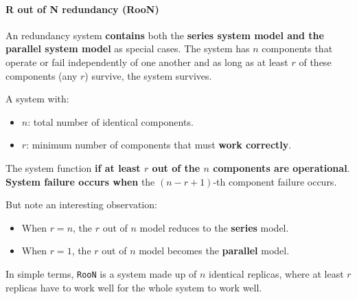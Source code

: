 \newpage

\paragraph{R out of N redundancy (RooN)}

An  redundancy system \textbf{contains} both the \textbf{series system model and the parallel system model} as special cases. The system has $n$ components that operate or fail independently of one another and as long as at least $r$ of these components (any $r$) survive, the system survives.\cite{nist8184Model}

\highspace
A system with:
\begin{itemize}
    \item $n$: total number of identical components.
    \item $r$: minimum number of components that must \textbf{work correctly}.
\end{itemize}
The system function \textbf{if at least $r$ out of the $n$ components are operational}. \textbf{System failure occurs when} the $\left(n - r + 1\right)$-th component failure occurs.\cite{nist8184Model}

\highspace
But note an interesting observation:
\begin{itemize}
    \item When $r=n$, the $r$ out of $n$ model reduces to the \textbf{series} model.\cite{nist8184Model}
    \item When $r=1$, the $r$ out of $n$ model becomes the \textbf{parallel} model.\cite{nist8184Model}
\end{itemize}
In simple terms, \texttt{RooN} is a system made up of $n$ identical replicas, where at least $r$ replicas have to work well for the whole system to work well.

